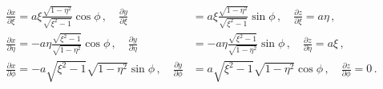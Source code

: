 \documentclass[a4paper,10pt]{article}
\numberwithin{equation}{section}
\begin{document}
  \begin{equation}\begin{split}
    \frac{\partial x}{\partial \xi} = a\xi \frac{\sqrt{1-\eta^2}}{\sqrt{\xi^2-1}} \cos{\phi}\, ,\quad
      \frac{\partial y}{\partial \xi} &= a\xi \frac{\sqrt{1-\eta^2}}{\sqrt{\xi^2-1}} \sin{\phi}\, ,\quad
      \frac{\partial z}{\partial \xi} = a\eta\, ,\\
    \frac{\partial x}{\partial \eta} = -a\eta \frac{\sqrt{\xi^2-1}}{\sqrt{1-\eta^2}} \cos{\phi}\, ,\quad
      \frac{\partial y}{\partial \eta} &= -a\eta \frac{\sqrt{\xi^2-1}}{\sqrt{1-\eta^2}} \sin{\phi}\, ,\quad
      \frac{\partial z}{\partial \eta} = a\xi\, ,\\
    \frac{\partial x}{\partial \phi} = -a\sqrt{\xi^2-1}\sqrt{1-\eta^2} \sin{\phi}\, ,\quad
      \frac{\partial y}{\partial \phi} &= a\sqrt{\xi^2-1}\sqrt{1-\eta^2} \cos{\phi}\, ,\quad
      \frac{\partial z}{\partial \phi} = 0\, .
  \end{split}\end{equation}
\end{document}
